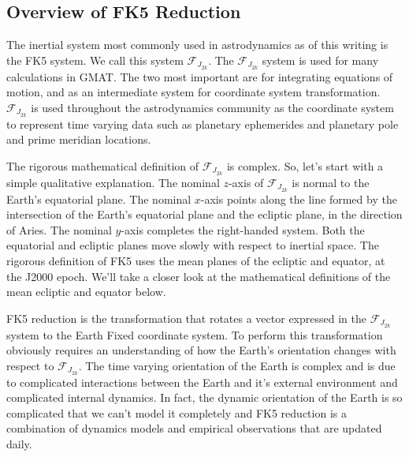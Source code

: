 \subsection{Overview of FK5 Reduction} 

The inertial system most commonly used in astrodynamics as of this
writing is the FK5 system.  We call this system
$\mathcal{F}_{J_{2k}}$.  The $\mathcal{F}_{J_{2k}}$ system is used
for many calculations in GMAT.  The two most important are for
integrating equations of motion, and as an intermediate system for
coordinate system transformation. $\mathcal{F}_{J_{2k}}$ is used
throughout the astrodynamics community as the coordinate system to
represent time varying data such as planetary ephemerides and
planetary pole and prime meridian locations.

The rigorous mathematical definition of $\mathcal{F}_{J_{2k}}$ is
complex. So, let's start with a simple qualitative explanation.
The nominal $z$-axis of $\mathcal{F}_{J_{2k}}$ is normal to the
Earth's equatorial plane.  The nominal $x$-axis points along the
line formed by the intersection of the Earth's equatorial plane
and the ecliptic plane, in the direction of Aries.  The nominal
$y$-axis completes the right-handed system. Both the equatorial
and ecliptic planes move slowly with respect to inertial space.
The rigorous definition of FK5 uses the mean planes of the
ecliptic and equator, at the J2000 epoch. We'll take a closer look
at the mathematical definitions of the mean ecliptic and equator
below.


FK5 reduction is the transformation that rotates a vector
expressed in the $\mathcal{F}_{J_{2k}}$ system to the Earth Fixed
coordinate system. To perform this transformation obviously
requires an understanding of how the Earth's orientation changes
with respect to $\mathcal{F}_{J_{2k}}$.  The time varying
orientation of the Earth is complex and is due to complicated
interactions between the Earth and it's external environment and
complicated internal dynamics. In fact, the dynamic orientation of
the Earth is so complicated that we can't model it completely and
FK5 reduction is a combination of dynamics models and empirical
observations that are updated daily.

